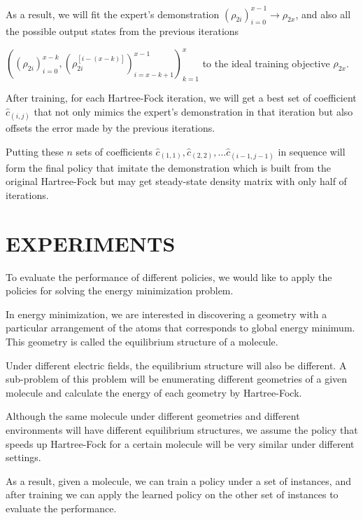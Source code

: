 \documentclass[twoside]{article}
\begin{document}
As a result, we will fit the expert's demonstration $(\rho_{2i})_{i=0}^{x-1} \rightarrow \rho_{2x}$, and also all the possible output states from the previous iterations 

$((\rho_{2i})_{i=0}^{x-k} ,(\rho_{2i}^{[i-(x-k)]})^{x-1}_{i=x-k+1})_{k=1}^{x}$  
to the ideal training objective $\rho_{2x}$.
%

After training, for each Hartree-Fock iteration, we will get a best set of coefficient $\hat{c}_{(i,j)}$ that not only mimics the expert's demonstration in that iteration but also offsets the error made by the previous iterations.

% 
Putting these $n$ sets of coefficients $\hat{c}_{(1,1)}, \hat{c}_{(2,2)}, \ldots  \hat{c}_{(i-1,j-1)}$ in sequence will form the final policy that imitate the demonstration which is built from  the original Hartree-Fock but may get steady-state density matrix with only half of iterations. 



\section{EXPERIMENTS}

To evaluate the performance of different policies, we would like to apply the policies for solving the energy minimization problem.

In energy minimization, we are interested in discovering a geometry with a particular arrangement of the atoms that corresponds to global energy minimum. This geometry is called the equilibrium structure of a molecule.

Under different electric fields, the equilibrium structure will also be different. A sub-problem of this problem will be enumerating different geometries of a given molecule and calculate the energy of each geometry by Hartree-Fock. 

 
Although the same molecule under different geometries and different environments will have different equilibrium structures, we assume the policy that speeds up Hartree-Fock for a certain molecule will be very similar under different settings. 

As a result, given a molecule, we can train a policy under a set of instances, and after training we can apply the learned policy on the other set of instances to evaluate the performance. 
 
\end{document}

